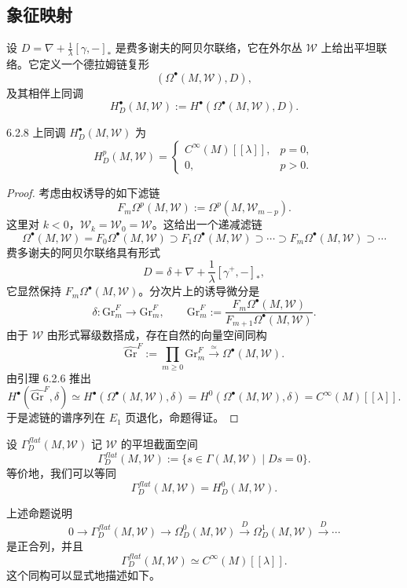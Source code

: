 \subsection{象征映射}

设 $D=\nabla+\frac1\lambda[\gamma,-]_*$ 是费多谢夫的阿贝尔联络，它在外尔丛 $\mathcal{W}$ 上给出平坦联络。它定义一个德拉姆链复形
\[
(\Omega^\bullet(M,\mathcal{W}),D),
\]
及其相伴上同调
\[
H^\bullet_D(M,\mathcal{W}):=H^\bullet(\Omega^\bullet(M,\mathcal{W}),D).
\]

\begin{proposition}{6.2.8}
  上同调 $H^\bullet_D(M,\mathcal{W})$ 为
  \[
  H^p_D(M,\mathcal{W})=\begin{cases}
  C^\infty(M)[[\lambda]], & p=0,\\
  0, & p>0.
  \end{cases}
  \]
\end{proposition}

\begin{proof}
  考虑由权诱导的如下滤链
  \[
  F_m\Omega^p(M,\mathcal{W}):=\Omega^p(M,\mathcal{W}_{m-p}).
  \]
  这里对 $k<0$，$\mathcal{W}_k=\mathcal{W}_0=\mathcal{W}$。这给出一个递减滤链
  \[
  \Omega^\bullet(M,\mathcal{W})=F_0\Omega^\bullet(M,\mathcal{W})
  \supset F_1\Omega^\bullet(M,\mathcal{W})\supset\cdots
  \supset F_m\Omega^\bullet(M,\mathcal{W})\supset\cdots
  \]
  费多谢夫的阿贝尔联络具有形式
  \[
  D=\delta+\nabla+\frac{1}{\lambda}[\gamma^+,-]_*,
  \]
  它显然保持 $F_m\Omega^\bullet(M,\mathcal{W})$。分次片上的诱导微分是
  \[
  \delta:\mathrm{Gr}^F_m\longrightarrow\mathrm{Gr}^F_m,
  \qquad
  \mathrm{Gr}^F_m:=\frac{F_m\Omega^\bullet(M,\mathcal{W})}
  {F_{m+1}\Omega^\bullet(M,\mathcal{W})}.
  \]
  由于 $\mathcal{W}$ 由形式幂级数搭成，存在自然的向量空间同构
  \[
  \widehat{\mathrm{Gr}}^F:=\prod_{m\ge0}\mathrm{Gr}^F_m
  \xrightarrow{\ \simeq\ }\Omega^\bullet(M,\mathcal{W}).
  \]
  由引理 6.2.6 推出
  \[
  H^\bullet(\widehat{\mathrm{Gr}}^F,\delta)\simeq
  H^\bullet(\Omega^\bullet(M,\mathcal{W}),\delta)
  =H^0(\Omega^\bullet(M,\mathcal{W}),\delta)=C^\infty(M)[[\lambda]].
  \]
  于是滤链的谱序列在 $E_1$ 页退化，命题得证。
\end{proof}

设 $\Gamma^{flat}_D(M,\mathcal{W})$ 记 $\mathcal{W}$ 的平坦截面空间
\[
\Gamma^{flat}_D(M,\mathcal{W})
:=\{s\in\Gamma(M,\mathcal{W})\mid Ds=0\}.
\]
等价地，我们可以等同
\[
\Gamma^{flat}_D(M,\mathcal{W})=H^0_D(M,\mathcal{W}).
\]

上述命题说明
\[
0\to\Gamma^{flat}_D(M,\mathcal{W})\to\Omega^0_D(M,\mathcal{W})
\xrightarrow{D}\Omega^1_D(M,\mathcal{W})\xrightarrow{D}\cdots
\]
是正合列，并且
\[
\Gamma^{flat}_D(M,\mathcal{W})\simeq C^\infty(M)[[\lambda]].
\]
这个同构可以显式地描述如下。

